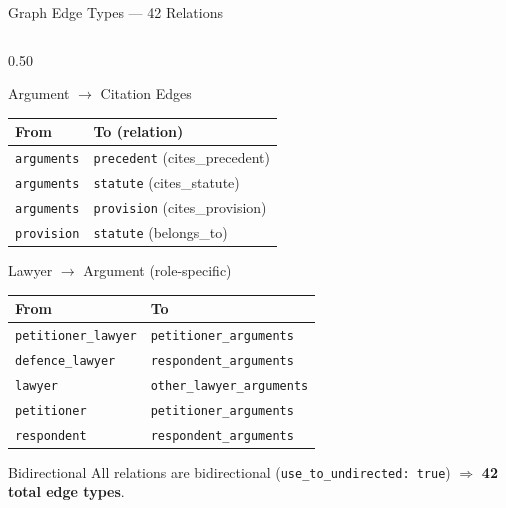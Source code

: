 \documentclass[aspectratio=169, 9pt]{beamer}
\begin{document}
\begin{frame}{Graph Edge Types — 42 Relations}
\begin{columns}[T]
\begin{column}{0.50\textwidth}
\begin{block}{\small Argument $\to$ Citation Edges}
        \begin{tabular}{ll}
          \toprule
          \textbf{From} & \textbf{To (relation)}\\
          \midrule
          \texttt{arguments} & \texttt{precedent} (cites\_precedent)\\
          \texttt{arguments} & \texttt{statute} (cites\_statute)\\
          \texttt{arguments} & \texttt{provision} (cites\_provision)\\
          \texttt{provision} & \texttt{statute} (belongs\_to)\\
          \bottomrule
        \end{tabular}
      \end{block}
      \vspace{4pt}
      \begin{block}{\small Lawyer $\to$ Argument (role-specific)}
        \scriptsize\renewcommand{\arraystretch}{1.1}
        \begin{tabular}{ll}
          \toprule
          \textbf{From} & \textbf{To}\\
          \midrule
          \texttt{petitioner\_lawyer} & \texttt{petitioner\_arguments}\\
          \texttt{defence\_lawyer}    & \texttt{respondent\_arguments}\\
          \texttt{lawyer}             & \texttt{other\_lawyer\_arguments}\\
          \texttt{petitioner}         & \texttt{petitioner\_arguments}\\
          \texttt{respondent}         & \texttt{respondent\_arguments}\\
          \bottomrule
        \end{tabular}
      \end{block}
      \vspace{4pt}
      \begin{alertblock}{\small Bidirectional}
        \scriptsize All relations are bidirectional (\texttt{use\_to\_undirected: true}) $\Rightarrow$ \textbf{42 total edge types}.
      \end{alertblock}
    \end{column}
  \end{columns}
\end{frame}
\end{document}
